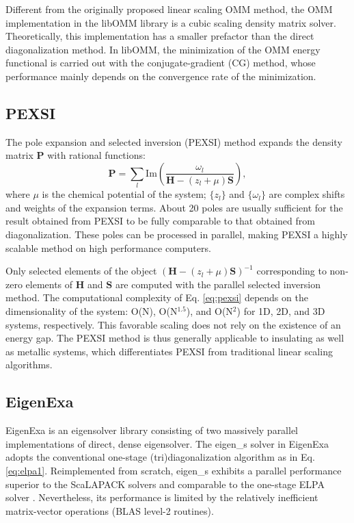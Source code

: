 \documentclass{report}
\begin{document}
Different from the originally proposed linear scaling OMM method, the OMM implementation in the libOMM library \cite{libomm_corsetti_2014} is a cubic scaling density matrix solver. Theoretically, this implementation has a smaller prefactor than the direct diagonalization method. In libOMM, the minimization of the OMM energy functional is carried out with the conjugate-gradient (CG) method, whose performance mainly depends on the convergence rate of the minimization.

\subsection{PEXSI}
\label{subsec:solvers_pexsi}
The pole expansion and selected inversion (PEXSI) method \cite{pexsi_lin_2009,pexsi_lin_2013} expands the density matrix $\boldsymbol{P}$ with rational functions:
\begin{equation}
\label{eq:pexsi}
\boldsymbol{P} = \sum_l \text{Im} \left( \frac{\omega_l}{\boldsymbol{H} - (z_l + \mu) \boldsymbol{S}} \right) ,
\end{equation}
where $\mu$ is the chemical potential of the system; $\{z_l\}$ and $\{\omega_l\}$ are complex shifts and weights of the expansion terms. About 20 poles are usually sufficient for the result obtained from PEXSI to be fully comparable to that obtained from diagonalization. These poles can be processed in parallel, making PEXSI a highly scalable method on high performance computers.

Only selected elements of the object $(\boldsymbol{H} - (z_l + \mu) \boldsymbol{S})^{-1}$ corresponding to non-zero elements of $\boldsymbol{H}$ and $\boldsymbol{S}$ are computed with the parallel selected inversion method. The computational complexity of Eq. \ref{eq:pexsi} depends on the dimensionality of the system: O(N), O(N$^{1.5}$), and O(N$^2$) for 1D, 2D, and 3D systems, respectively. This favorable scaling does not rely on the existence of an energy gap. The PEXSI method is thus generally applicable to insulating as well as metallic systems, which differentiates PEXSI from traditional linear scaling algorithms.

\subsection{EigenExa}
\label{subsec:solvers_exa}
EigenExa is an eigensolver library consisting of two massively parallel implementations of direct, dense eigensolver. The eigen\_s solver in EigenExa adopts the conventional one-stage (tri)diagonalization algorithm as in Eq. \ref{eq:elpa1}. Reimplemented from scratch, eigen\_s exhibits a parallel performance superior to the ScaLAPACK solvers and comparable to the one-stage ELPA solver \cite{eigenexa_imamura_2011,eigenexa_fukaya_2015}. Nevertheless, its performance is limited by the relatively inefficient matrix-vector operations (BLAS level-2 routines).
\end{document}
